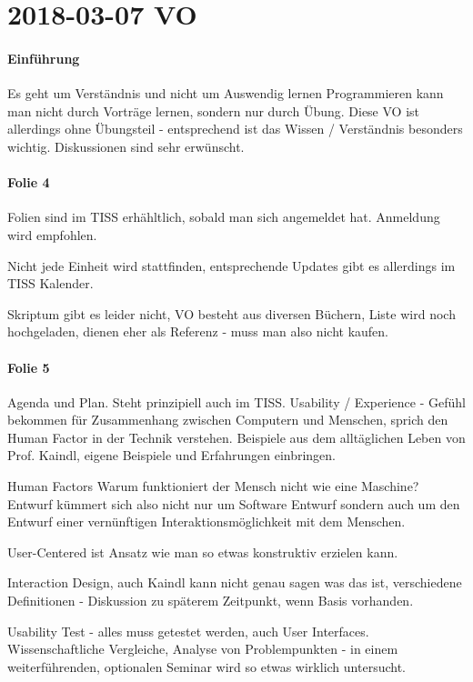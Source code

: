 \section{2018-03-07 VO}
\paragraph{Einführung}
Es geht um Verständnis und nicht um Auswendig lernen
Programmieren kann man nicht durch Vorträge lernen, sondern nur durch Übung.
Diese VO ist allerdings ohne Übungsteil - entsprechend ist das Wissen / Verständnis
besonders wichtig. 
Diskussionen sind sehr erwünscht.

\paragraph{Folie 4}
Folien sind im TISS erhähltlich, sobald man sich angemeldet hat. Anmeldung wird
empfohlen.

Nicht jede Einheit wird stattfinden, entsprechende Updates gibt es allerdings
im TISS Kalender. 

Skriptum gibt es leider nicht, VO besteht aus diversen Büchern, Liste wird noch
hochgeladen, dienen eher als Referenz - muss man also nicht kaufen.

\paragraph{Folie 5}
Agenda und Plan. Steht prinzipiell auch im TISS.
Usability / Experience - Gefühl bekommen für Zusammenhang zwischen Computern und 
Menschen, sprich den Human Factor in der Technik verstehen.
Beispiele aus dem alltäglichen Leben von Prof. Kaindl, eigene Beispiele und Erfahrungen
einbringen.

Human Factors
Warum funktioniert der Mensch nicht wie eine Maschine? Entwurf kümmert sich also
nicht nur um Software Entwurf sondern auch um den Entwurf einer vernünftigen 
Interaktionsmöglichkeit mit dem Menschen. 

User-Centered ist Ansatz wie man so etwas konstruktiv erzielen kann. 

Interaction Design, auch Kaindl kann nicht genau sagen was das ist, verschiedene
Definitionen - Diskussion zu späterem Zeitpunkt, wenn Basis vorhanden.

Usability Test - alles muss getestet werden, auch User Interfaces. Wissenschaftliche
Vergleiche, Analyse von Problempunkten - in einem weiterführenden, optionalen Seminar
wird so etwas wirklich untersucht.


